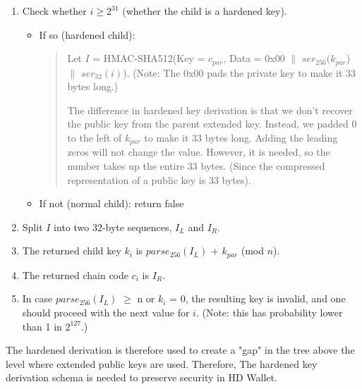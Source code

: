 \begin{enumerate}
    \item Check whether $i \geq 2^{31}$ (whether the child is a hardened key).
          \begin{itemize}
              \item If so (hardened child):
                    \begin{quote}

                        Let $I$ = HMAC-SHA512(Key = $c_{par}$, Data = 0x00 $\parallel$ $ser_{256}(k_{par}$) $\parallel$ $ser_{32}(i)$). (Note: The 0x00 pads the private key to make it 33 bytes long.)

                        The difference in hardened key derivation is that we don't recover the public key from the parent extended key. Instead, we padded 0 to the left of $k_{par}$ to make it 33 bytes long. Adding the leading zeros will not change the value. However, it is needed, so the number takes up the entire 33 bytes. (Since the compressed representation of a public key is 33 bytes).
                    \end{quote}


              \item If not (normal child): return false

          \end{itemize}
          \bigskip

    \item Split $I$ into two 32-byte sequences, $I_L$ and $I_R$.
          \bigskip

    \item The returned child key $k_i$ is $parse_{256}(I_L)$ + $k_{par}$ (mod $n$).
          \bigskip

    \item The returned chain code $c_i$ is $I_R$.
          \bigskip

    \item In case $parse_{256}(I_L)$ $\geq$ n or $k_i$ = 0, the resulting key is invalid, and one should proceed with the next value for $i$. (Note: this has probability lower than 1 in $2^{127}$.)

\end{enumerate}

The hardened derivation is therefore used to create a "gap" in the tree above the level where extended public keys are used. Therefore, The hardened key derivation schema is needed to preserve security in HD Wallet.

